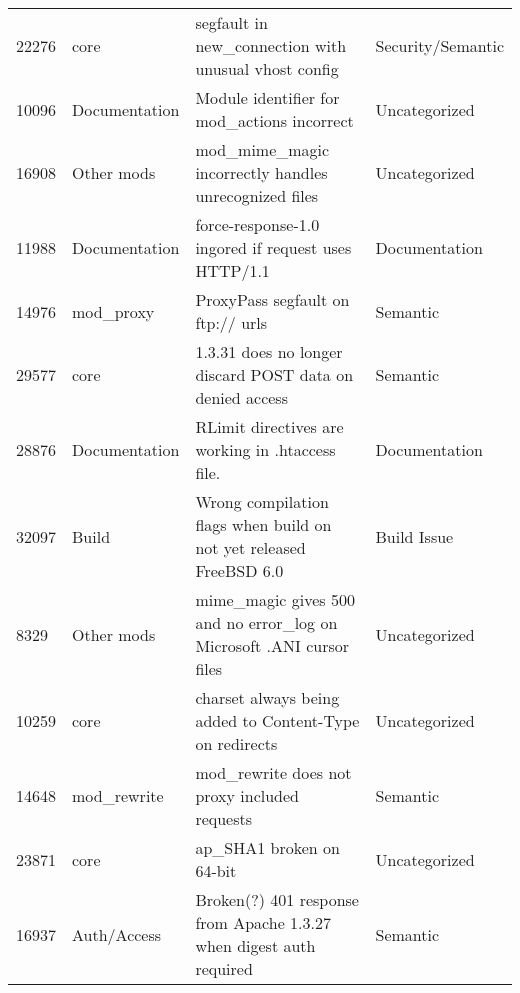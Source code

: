 \begin{longtable}[c]{p{1cm}p{3cm}p{6cm}p{4cm}}
22276  & core               & segfault in new\_connection with unusual vhost config                                                          & Security/Semantic \\
10096  & Documentation      & Module identifier for mod\_actions incorrect                                                                   & Uncategorized     \\
16908  & Other mods         & mod\_mime\_magic incorrectly handles unrecognized files                                                        & Uncategorized     \\
11988  & Documentation      & force-response-1.0 ingored if request uses HTTP/1.1                                                            & Documentation     \\
14976  & mod\_proxy         & ProxyPass segfault on ftp:// urls                                                                              & Semantic          \\
29577  & core               & 1.3.31 does no longer discard POST data on denied access                                                       & Semantic          \\
28876  & Documentation      & RLimit directives are working in .htaccess file.                                                               & Documentation     \\
32097  & Build              & Wrong compilation flags when build on not yet released FreeBSD 6.0                                             & Build Issue       \\
8329   & Other mods         & mime\_magic gives 500 and no error\_log on Microsoft .ANI cursor files                                         & Uncategorized     \\
10259  & core               & charset always being added to Content-Type on redirects                                                        & Uncategorized     \\
14648  & mod\_rewrite       & mod\_rewrite does not proxy included requests                                                                  & Semantic          \\
23871  & core               & ap\_SHA1 broken on 64-bit                                                                                      & Uncategorized     \\
16937  & Auth/Access        & Broken(?) 401 response from Apache 1.3.27 when digest auth required                                            & Semantic          \\

\end{longtable}
